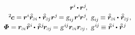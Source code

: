 \begin{equation*}
\begin{array}{r@{\hspace{.5em}}l}
\currentlocationvector^{i} \hspace{-0.2ex} \dotp \hspace{-0.15ex} \currentlocationvector^j
\hspace{-0.3ex} ,
\\[.25em]
%
{{^2}\hspace{-0.2ex}\bm{c}} = \hspace{-0.1ex} \currentlocationvector^{i} \initiallocationvector_\differentialindex{i} \hspace{-0.1ex} \dotp \hspace{.1ex} \initiallocationvector_\differentialindex{\hspace{-0.1ex}j} \currentlocationvector^{j} \hspace{-0.25ex}
= \textsl{g}_{i\hspace{-0.1ex}j} \hspace{.1ex} \currentlocationvector^{i} \hspace{-0.2ex} \currentlocationvector^{j}
\hspace{-0.3ex} , &
\textsl{g}_{i\hspace{-0.1ex}j} \hspace{-0.15ex} \equiv
\initiallocationvector_\differentialindex{i} \hspace{-0.1ex} \dotp \hspace{.1ex} \initiallocationvector_\differentialindex{\hspace{-0.1ex}j}
\hspace{.1ex} ,
\\[.25em]
%
\mathboldPhi = \hspace{-0.1ex} \currentlocationvector_\differentialindex{i} \hspace{.1ex} \initiallocationvector^i \hspace{-0.15ex} \dotp \hspace{.1ex} \initiallocationvector^j \hspace{-0.25ex} \currentlocationvector_\differentialindex{\hspace{-0.1ex}j} \hspace{-0.2ex}
= \textsl{g}^{\hspace{.2ex}i\hspace{-0.1ex}j} \currentlocationvector_\differentialindex{i} \currentlocationvector_\differentialindex{\hspace{-0.1ex}j}
\hspace{.1ex} , &
\textsl{g}^{\hspace{.2ex}i\hspace{-0.1ex}j} \hspace{-0.15ex} \equiv
\initiallocationvector^{\hspace{.1ex}i} \hspace{-0.15ex} \dotp \hspace{.1ex} \initiallocationvector^{\hspace{.1ex}j}
\end{array}
\end{equation*}

